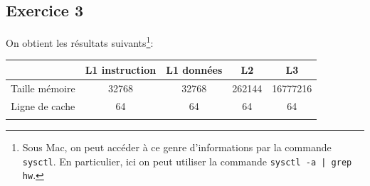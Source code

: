 \documentclass[11pt, a4 paper]{article}
\begin{document}
\subsection{Exercice 3}
On obtient les résultats suivants\footnote{Sous Mac, on peut accéder à ce genre d'informations par la commande \texttt{sysctl}. En particulier, ici on peut utiliser la commande \texttt{sysctl -a | grep hw}.}:
\begin{center}
    \begin{tabular}{| c || c | c | c | c |}
        \hline
    & L1 instruction & L1 données & L2 & L3 \\
        \hline
    Taille mémoire & 32768 & 32768 & 262144 & 16777216 \\
        \hline
    Ligne de cache & 64 & 64 & 64 & 64 \\
        \hline
    & & & & \\
        \hline
    \end{tabular}
\end{center}

\begin{center}
\end{center}





\end{document}
